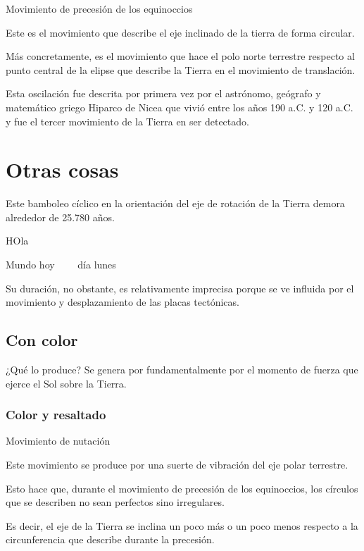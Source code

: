 \documentclass[12pt,a4paper]{article}
\begin{document}
	Movimiento de precesión de los equinoccios
	
	Este es el movimiento que describe el eje inclinado de la tierra de forma circular.
	
	Más concretamente, es el movimiento que hace el polo norte terrestre respecto al punto central de la elipse 
	que describe la Tierra en el movimiento de translación.
	
	Esta oscilación fue descrita por primera vez por el astrónomo, geógrafo y matemático griego Hiparco de Nicea 
	que vivió entre los años 190 a.C. y 120 a.C. y fue el tercer movimiento de la Tierra en ser detectado.
\section{Otras cosas}
	Este bamboleo cíclico en la orientación del eje de rotación de la Tierra demora alrededor de 25.780 años. 
	\clearpage
	
\vspace*{5cm}
HOla

\vspace{4cm}

\hspace*{3cm} Mundo \hspace{4cm} hoy \ \ \ \ día \quad lunes 
	
	Su duración, no obstante, es relativamente imprecisa porque se ve influida por el movimiento y desplazamiento 
	de las placas tectónicas.
\subsection{Con color}
	¿Qué lo produce? Se genera por fundamentalmente por el momento de fuerza que ejerce el Sol sobre la Tierra. 
	
\subsubsection{Color y resaltado}	
	
	
	Movimiento de nutación
	
	Este movimiento se produce por una suerte de vibración del eje polar terrestre.
	
	Esto hace que, durante el movimiento de precesión de los equinoccios, los círculos que se describen no sean 
	perfectos sino irregulares.
	
	Es decir, el eje de la Tierra se inclina un poco más o un poco menos respecto a la circunferencia que describe 
	durante la precesión.
	
\end{document}
